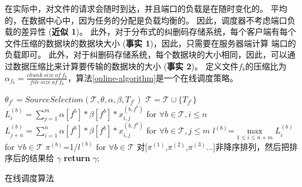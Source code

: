 在实际中，对文件的请求会随时到达，并且端口的负载是在随时变化的。
平均的，在数据中心中，因为任务的分配是负载均衡的\cite{dean2008mapreduce,dogar2014decentralized,luo2016towards}。
因此，调度器不考虑端口负载的差异性 (\textbf{近似 1})。
此外，对于分布式的纠删码存储系统，每个客户端有每个文件压缩的数据块的数据块大小 (\textbf{事实 1})，因此，只需要在服务器端计算
端口的负载即可。
此外，对于纠删码存储系统，每个数据块的大小相同，因此，可以通过数据压缩比来计算要传输的数据块的大小 (\textbf{事实 2})。
定义文件$f_b$的压缩比为 $\alpha_{f_b}=\frac{chunk\ size \ of \ f_b}{file \ size \ of \ f_b}$，算法\ref{online-algorithm}是一个在线调度策略。

\begin{algorithm}
\KwOut{$\gamma$}
 $\theta_{f^c}= SourceSelection(\mathcal{T},\theta,\alpha,\beta,T_{f^c})$\;
 $\mathcal{T} = \mathcal{T} \cup \{T_{f^c}\}$\;
$L_i^{(b)}= \sum_{j=1}^{m}\alpha[f^b]*\beta[f^b]*x_{i,j}^{(b,f^b)}$ for $\forall b \in \mathcal{T},i \le n$\;
$L_{j+n}^{(b)}= \sum_{i=1}^n\alpha[f^b]*\beta[f^b]*x_{i,j}^{(b,f^b)}$ for $\forall b \in \mathcal{T},j \le m$\;
$l^{(b)}$=$ \max \limits_{1 \le i \le n+m}L_i^{(b)}$ for $\forall b \in\mathcal{T}$ \;
$\pi^{(b)}$=1/$l^{(b)}$ for $\forall b \in \mathcal{T}$ \;
对[$\pi^{(1)}$,$\pi^{(2)}$,$\pi^{(3)}$...]非降序排列，然后把排序后的结果给 $\gamma$\;
  \textbf{return} $\gamma$;
\caption{在线调度算法}
\label{online-algorithm}
\end{algorithm}

